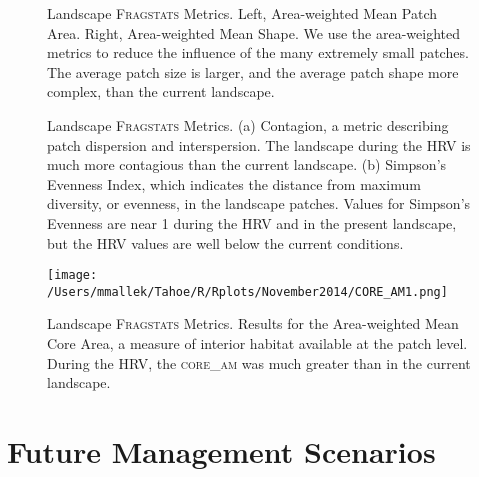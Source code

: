 \clearpage

\begin{figure}[!htbp]
  \centering
\caption{Landscape \textsc{Fragstats} Metrics. Left, Area-weighted Mean Patch Area. Right, Area-weighted Mean Shape. We use the area-weighted metrics to reduce the influence of the many extremely small patches. The average patch size is larger, and the average patch shape more complex, than the current landscape.} 
\label{fig:fragland_areashape}
\end{figure}

\begin{figure}[!htbp]
  \centering
\caption{Landscape \textsc{Fragstats} Metrics. (a) Contagion, a metric describing patch dispersion and interspersion. The landscape during the HRV is much more contagious than the current landscape. (b) Simpson's Evenness Index, which indicates the distance from maximum diversity, or evenness, in the landscape patches. Values for Simpson's Evenness are near 1 during the HRV and in the present landscape, but the HRV values are well below the current conditions.} 
\label{fig:fragland_contagsiei}
\end{figure}

\begin{figure}[!htbp]
  \centering
  \texttt{[image: /Users/mmallek/Tahoe/R/Rplots/November2014/CORE\_AM1.png]}
\caption{Landscape \textsc{Fragstats} Metrics. Results for the Area-weighted Mean Core Area, a measure of interior habitat available at the patch level. During the HRV, the \textsc{core\_am} was much greater than in the current landscape.} 
\label{fig:fragland_core}
\end{figure}


\section{Future Management Scenarios}